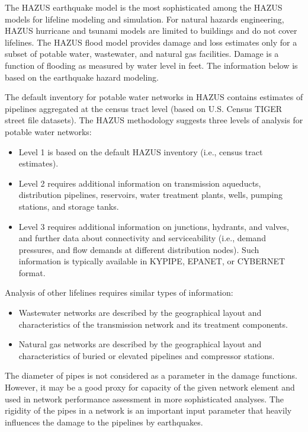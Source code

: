 The HAZUS earthquake model is the most sophisticated among the HAZUS models for lifeline modeling and simulation. For natural hazards engineering, HAZUS hurricane and tsunami models are limited to buildings and do not cover lifelines. The HAZUS flood model provides damage and loss estimates only for a subset of potable water, wastewater, and natural gas facilities. Damage is a function of flooding as measured by water level in feet. The information below is based on the earthquake hazard modeling.

The default inventory for potable water networks in HAZUS contains estimates of pipelines aggregated at the census tract level (based on U.S. Census TIGER street file datasets). The HAZUS methodology suggests three levels of analysis for potable water networks:

\begin{itemize}
    \item Level 1 is based on the default HAZUS inventory (i.e., census tract estimates).
    \item Level 2 requires additional information on transmission aqueducts, distribution pipelines, reservoirs, water treatment plants, wells, pumping stations, and storage tanks. 
    \item Level 3 requires additional information on junctions, hydrants, and valves, and further data about connectivity and serviceability (i.e., demand pressures, and flow demands at different distribution nodes). Such information is typically available in KYPIPE, EPANET, or CYBERNET format.
\end{itemize}

\noindent Analysis of other lifelines requires similar types of information:

\begin{itemize}
    \item Wastewater networks are described by the geographical layout and characteristics of the transmission network and its treatment components.
    \item Natural gas networks are described by the geographical layout and characteristics of buried or elevated pipelines and compressor stations.
\end{itemize}

The diameter of pipes is not considered as a parameter in the damage functions. However, it may be a good proxy for capacity of the given network element and used in network performance assessment in more sophisticated analyses. The rigidity of the pipes in a network is an important input parameter that heavily influences the damage to the pipelines by earthquakes. 

